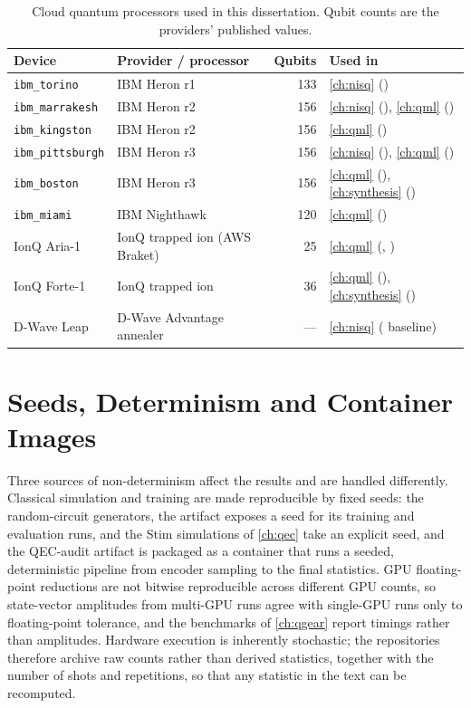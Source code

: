 \begin{table}[htbp]
\caption{Cloud quantum processors used in this dissertation. Qubit counts are the providers' published values.}
\label{tab:apprepro:devices}
\centering
\begingroup\singlespacing\footnotesize
\begin{tabular}{@{}>{\raggedright\arraybackslash}p{2.9cm}>{\raggedright\arraybackslash}p{3.5cm}r>{\raggedright\arraybackslash}p{4.2cm}@{}}
\toprule
Device & Provider / processor & Qubits & Used in \\
\midrule
\texttt{ibm\_torino} & IBM Heron r1 & 133 & \cref{ch:nisq} (\deal{}) \\
\texttt{ibm\_marrakesh} & IBM Heron r2 & 156 & \cref{ch:nisq} (\deal{}), \cref{ch:qml} (\shardq{}) \\
\texttt{ibm\_kingston} & IBM Heron r2 & 156 & \cref{ch:qml} (\vqt{}) \\
\texttt{ibm\_pittsburgh} & IBM Heron r3 & 156 & \cref{ch:nisq} (\qawa{}), \cref{ch:qml} (\shardq{}) \\
\texttt{ibm\_boston} & IBM Heron r3 & 156 & \cref{ch:qml} (\nnqa{}), \cref{ch:synthesis} (\rubriq{}) \\
\texttt{ibm\_miami} & IBM Nighthawk & 120 & \cref{ch:qml} (\nnqa{}) \\
IonQ Aria-1 & IonQ trapped ion (AWS Braket) & 25 & \cref{ch:qml} (\qpie{}, \vqt{}) \\
IonQ Forte-1 & IonQ trapped ion & 36 & \cref{ch:qml} (\nnqa{}), \cref{ch:synthesis} (\rubriq{}) \\
D-Wave Leap & D-Wave Advantage annealer & --- & \cref{ch:nisq} (\deal{} baseline) \\
\bottomrule
\end{tabular}
\endgroup
\end{table}

\section{Seeds, Determinism and Container Images}\label{sec:apprepro:seeds}

Three sources of non-determinism affect the results and are handled differently. Classical simulation and training are made reproducible by fixed seeds: the \qgear{} random-circuit generators, the \rubriq{} artifact exposes a seed for its training and evaluation runs, and the Stim simulations of \cref{ch:qec} take an explicit seed, and the QEC-audit artifact is packaged as a container that runs a seeded, deterministic pipeline from encoder sampling to the final statistics. GPU floating-point reductions are not bitwise reproducible across different GPU counts, so state-vector amplitudes from multi-GPU runs agree with single-GPU runs only to floating-point tolerance, and the benchmarks of \cref{ch:qgear} report timings rather than amplitudes. Hardware execution is inherently stochastic; the repositories therefore archive raw counts rather than derived statistics, together with the number of shots and repetitions, so that any statistic in the text can be recomputed.

